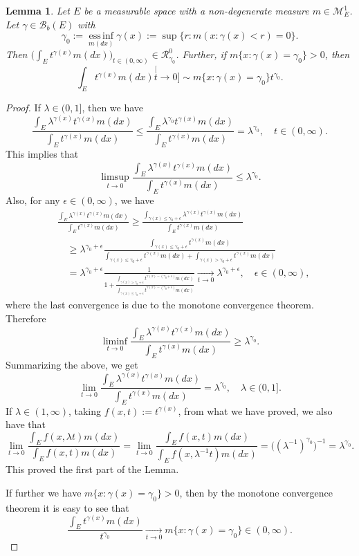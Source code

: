 \documentclass[12pt, a4paper]{amsart}
\newtheorem{lem}[thm]{Lemma}
\theoremstyle{definition}
\numberwithin{equation}{section}
\begin{document}
\begin{lem}\label{lem:regularly_variation_and_integration}
	Let $E$ be a measurable space with a non-degenerate measure $m \in \mathcal M^1_E$.
	Let $ \gamma \in \mathscr B_b(E)$ with
\[
	\gamma_0
	:= \operatorname*{ess\,inf}_{m(dx)} \gamma(x)
	:= \sup\{r:m(x:\gamma(x) < r) = 0\}.
\]
	Then $\big(\int_E t^{\gamma(x)} m(dx)\big)_{t\in (0,\infty)} \in \mathcal R^0_{\gamma_0}$.
	Further, if $m\{x:\gamma(x) = \gamma_0\}>0$, then
\[
	\int_E t^{\gamma(x)} m(dx)
	\stackrel[t\to 0]{}{\sim}  m\{x:\gamma(x) = \gamma_0\} t^{\gamma_0}.
\]
	
\end{lem}

\begin{proof}
	If $\lambda \in (0,1]$, then we have
\[
	\frac{\int_E \lambda^{\gamma(x)} t^{\gamma(x)} m(dx)}{\int_E t^{\gamma(x)} m(dx)}
	\leq \frac{\int_E \lambda^{\gamma_0} t^{\gamma(x)} m(dx)}{\int_E t^{\gamma(x)} m(dx)}
	= \lambda^{\gamma_0},
	\quad t\in (0,\infty).
\]
	This implies that
\[
	\limsup_{t\to 0}\frac{\int_E \lambda^{\gamma(x)} t^{\gamma(x)} m(dx)}{\int_E t^{\gamma(x)} m(dx)}
	\leq \lambda ^{\gamma_0}.
\]
	Also, for any $\epsilon \in (0,\infty)$, we have
\[\begin{split}
	&\frac{\int_E \lambda^{\gamma(x)} t^{\gamma(x)} m(dx)}{\int_E t^{\gamma(x)} m(dx)}
	\geq \frac{ \int_{ \gamma(x) \leq  \gamma_0 + \epsilon } \lambda^{ \gamma(x) } t^{ \gamma(x)} m(dx) } { \int_E t^{ \gamma(x) } m(dx) }
	\\&\quad \geq \lambda^{ \gamma_0 + \epsilon} \frac{ \int_{ \gamma(x) \leq \gamma_0 + \epsilon } t^{ \gamma(x)} m(dx) } { \int_{ \gamma(x) \leq \gamma_0 + \epsilon}t^{\gamma(x)}m(dx)+ \int_{\gamma(x) > \gamma_0 + \epsilon} t^{\gamma(x)}m(dx)}
	\\&\quad = \lambda^{\gamma_0 + \epsilon} \frac{1}{1+ \frac{\int_{\gamma(x) > \gamma_0 + \epsilon}t^{\gamma(x) - (\gamma_0 + \epsilon)}m(dx)}{\int_{\gamma(x) \leq \gamma_0 + \epsilon}t^{\gamma(x)- (\gamma_0 + \epsilon)}m(dx)}}
	\xrightarrow[t\to 0]{} \lambda ^{\gamma_0 + \epsilon},
	\quad \epsilon\in (0, \infty),
\end{split}\]
	where the last convergence is due to the monotone convergence theorem.
	Therefore
\[
	\liminf_{t\to 0}\frac{\int_E \lambda^{\gamma(x)} t^{\gamma(x)} m(dx)}{\int_E t^{\gamma(x)} m(dx)}
	\geq \lambda ^{\gamma_0}.
\]
	Summarizing the above,  we get
\[
	\lim_{t\to 0}\frac{\int_E \lambda^{\gamma(x)} t^{\gamma(x)} m(dx)}{\int_E t^{\gamma(x)} m(dx)}
	= \lambda ^{\gamma_0},	
	\quad \lambda \in (0,1].
\]
	If $\lambda \in (1,\infty)$, taking $f(x, t):= t^{\gamma(x)}$, from what we have proved, we also have that
\[
	\lim_{t\to 0}\frac{\int_E f(x,\lambda t)m(dx)}{\int_E f(x, t)m(dx)}
	= \lim_{t\to 0}\frac{\int_E f(x,t)m(dx)}{\int_E f(x, \lambda^{-1} t)m(dx)}
	= \big((\lambda^{-1})^{\gamma_0} \big)^{-1}
	= \lambda ^{\gamma_0}.
\]
	This proved the first part of the Lemma.
	
	If further we have $m\{x:\gamma(x) = \gamma_0\}>0$, then by the monotone convergence theorem  it is easy to see that
\[
	\frac{\int_E t^{\gamma(x)} m(dx)}{t^{\gamma_0}}
	\xrightarrow[t\to 0]{} m\{x:\gamma(x) = \gamma_0\}\in (0,\infty) .
\]
\end{proof}
\end{document}
